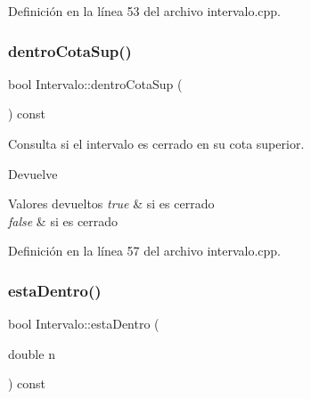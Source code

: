 Definición en la línea 53 del archivo intervalo.\+cpp.


\begin{DoxyCode}{0}

\end{DoxyCode}
\mbox{\label{classIntervalo_aed0964a68d4b727bd104f5128ee7a7ef}} 
\subsubsection{\texorpdfstring{dentroCotaSup()}{dentroCotaSup()}}
{\footnotesize\ttfamily bool Intervalo\+::dentro\+Cota\+Sup (\begin{DoxyParamCaption}{ }\end{DoxyParamCaption}) const}



Consulta si el intervalo es cerrado en su cota superior. 

\begin{DoxyReturn}{Devuelve}

\end{DoxyReturn}

\begin{DoxyRetVals}{Valores devueltos}
{\em true} & si es cerrado\\
\hline
{\em false} & si es cerrado \\
\hline
\end{DoxyRetVals}


Definición en la línea 57 del archivo intervalo.\+cpp.


\begin{DoxyCode}{0}

\end{DoxyCode}
\mbox{\label{classIntervalo_a2cccd9264f1b3912c6006fe3e2a70289}} 
\subsubsection{\texorpdfstring{estaDentro()}{estaDentro()}}
{\footnotesize\ttfamily bool Intervalo\+::esta\+Dentro (\begin{DoxyParamCaption}\item[{double}]{n }\end{DoxyParamCaption}) const}



